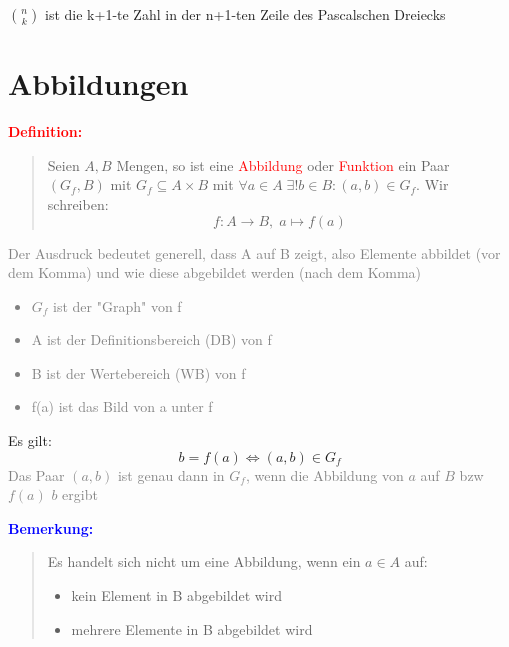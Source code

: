\documentclass{article}
\newcommand{\red}[1]{\textcolor{red}{#1}}
\newcommand{\gray}[1]{\textcolor{gray}{#1}}
\newcommand{\blue}[1]{\textcolor{blue}{#1}}
\newcommand{\de}[1]{\red{\textbf{Definition: }}\begin{quote}#1\end{quote}}
\newcommand{\an}[1]{\blue{\textbf{Bemerkung: }}\begin{quote}#1\end{quote}}
\newcommand{\n}[1]{\overline{#1}}
\begin{document}
\begin{center}
\end{center}

\begin{center}
    $\binom{n}{k}$ ist die k+1-te Zahl in der n+1-ten Zeile des Pascalschen Dreiecks
\end{center}

\newpage
\section{Abbildungen}

\de{Seien $A, B$ Mengen, so ist eine \red{Abbildung} oder \red{Funktion} ein Paar $(G_f, B)$ mit $G_f \subseteq A \times B$ mit $\forall a \in A \; \exists! b \in B: (a, b) \in G_f$. Wir schreiben:
\begin{equation*}
    f: A \to B, \; a \mapsto f(a)
\end{equation*}
}

\gray{Der Ausdruck bedeutet generell, dass A auf B zeigt, also Elemente abbildet (vor dem Komma) und wie diese abgebildet werden (nach dem Komma)}
\gray{
    \begin{itemize}
        \item $G_f$ ist der "Graph" von f
        \item A ist der Definitionsbereich (DB) von f
        \item B ist der Wertebereich (WB) von f
        \item f(a) ist das Bild von a unter f
    \end{itemize}
}
Es gilt:
\begin{equation*}
    b = f(a) \iff (a, b) \in G_f
\end{equation*}
\gray{Das Paar $(a, b)$ ist genau dann in $G_f$, wenn die Abbildung von $a$ auf $B$ bzw $f(a)$ $b$ ergibt}

\an{
    Es handelt sich nicht um eine Abbildung, wenn ein $a \in A$ auf:
    \begin{itemize}
        \item kein Element in B abgebildet wird
        \item mehrere Elemente in B abgebildet wird
    \end{itemize}
}
\end{document}
